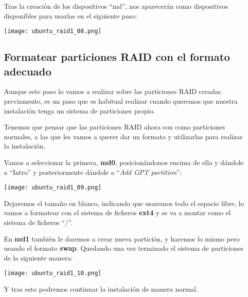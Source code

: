 Tras la creación de los dispositivos “md”, nos aparecerán como dispositivos disponibles para usarlas en el siguiente paso:

\begin{center}
    \texttt{[image: ubuntu\_raid1\_08.png]}
\end{center}

\subsection{Formatear particiones RAID con el formato adecuado}
Aunque este paso lo vamos a realizar sobre las particiones RAID creadas previamente, es un paso que es habitual realizar cuando queremos que nuestra instalación tenga un sistema de particiones propio.

Tenemos que pensar que las particiones RAID ahora son como particiones normales, a las que les vamos a querer dar un formato y utilizarlas para realizar la instalación.

Vamos a seleccionar la primera, \textbf{md0}, posicionándonos encima de ella y dándole a “Intro” y posteriormente dándole a “\textit{Add GPT partition}”:

\begin{center}
    \texttt{[image: ubuntu\_raid1\_09.png]}
\end{center}

Dejaremos el tamaño en blanco, indicando que usaremos todo el espacio libre, lo vamos a formatear con el sistema de ficheros \textbf{ext4} y se va a montar como el sistema de ficheros “/”.

En \textbf{md1} también le daremos a crear nueva partición, y haremos lo mismo pero usando el formato \textbf{swap}. Quedando una vez terminado el sistema de particiones de la siguiente manera:

\begin{center}
    \texttt{[image: ubuntu\_raid1\_10.png]}
\end{center}

Y tras esto podremos continuar la instalación de manera normal.
\clearpage